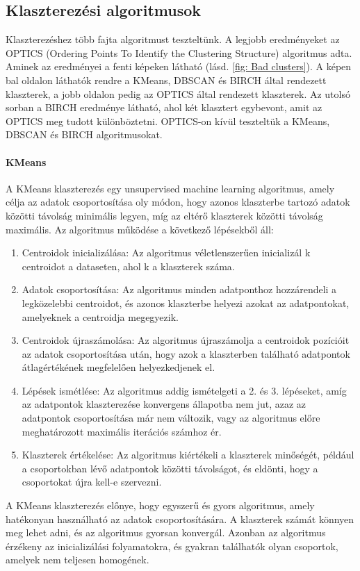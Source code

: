 \documentclass[12pt,a4paper]{article}
\begin{document}
\subsection{Klaszterezési algoritmusok}
Klaszterezéshez több fajta algoritmust teszteltünk. A legjobb eredményeket az OPTICS (Ordering Points To Identify the Clustering Structure) \cite{10.1145/304181.304187} algoritmus adta.
Aminek az eredményei a fenti képeken látható (lásd. \ref{fig: Bad clusters}). A képen bal oldalon láthatók rendre a KMeans, DBSCAN és BIRCH által rendezett klaszterek, a jobb oldalon pedig az OPTICS által rendezett klaszterek. Az utolsó sorban a BIRCH eredménye látható, ahol két klasztert egybevont, amit az OPTICS meg tudott különböztetni.
OPTICS-on kívül teszteltük a KMeans, DBSCAN és BIRCH algoritmusokat.
\paragraph{KMeans} A KMeans klaszterezés egy unsupervised machine learning algoritmus, amely célja az adatok csoportosítása oly módon, hogy azonos klaszterbe tartozó adatok közötti távolság minimális legyen, míg az eltérő klaszterek közötti távolság maximális.
Az algoritmus működése a következő lépésekből áll:
\begin{enumerate}
    \item Centroidok inicializálása: Az algoritmus véletlenszerűen inicializál k centroidot a dataseten, ahol k a klaszterek száma.
    \item Adatok csoportosítása: Az algoritmus minden adatponthoz hozzárendeli a legközelebbi centroidot, és azonos klaszterbe helyezi azokat az adatpontokat, amelyeknek a centroidja megegyezik.
    \item Centroidok újraszámolása: Az algoritmus újraszámolja a centroidok pozícióit az adatok csoportosítása után, hogy azok a klaszterben található adatpontok átlagértékének megfelelően helyezkedjenek el.
    \item Lépések ismétlése: Az algoritmus addig ismételgeti a 2. és 3. lépéseket, amíg az adatpontok klaszterezése konvergens állapotba nem jut, azaz az adatpontok csoportosítása már nem változik, vagy az algoritmus előre meghatározott maximális iterációs számhoz ér.
    \item Klaszterek értékelése: Az algoritmus kiértékeli a klaszterek minőségét, például a csoportokban lévő adatpontok közötti távolságot, és eldönti, hogy a csoportokat újra kell-e szervezni.
\end{enumerate}
A KMeans klaszterezés előnye, hogy egyszerű és gyors algoritmus, amely hatékonyan használható az adatok csoportosítására. A klaszterek számát könnyen meg lehet adni, és az algoritmus gyorsan konvergál. Azonban az algoritmus érzékeny az inicializálási folyamatokra, és gyakran találhatók olyan csoportok, amelyek nem teljesen homogének.
\end{document}
